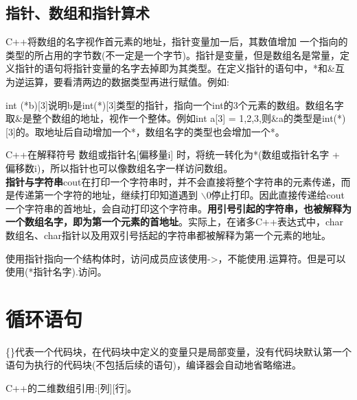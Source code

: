 \documentclass[]{article}
\begin{document}
\subsection{指针、数组和指针算术}
C++将数组的名字视作首元素的地址，指针变量加一后，其数值增加 一个指向的类型的所占用的字节数(不一定是一个字节)。指针是变量，但是数组名是常量，定义指针的语句将指针变量的名字去掉即为其类型。在定义指针的语句中，*和\&互为逆运算，要看清两边的数据类型再进行赋值。例如:\begin{center}
	int (*b)[3]说明b是int(*)[3]类型的指针，指向一个int的3个元素的数组。数组名字取\&是整个数组的地址，视作一个整体。例如int a[3] = {1,2,3},则\&a的类型是int(*)[3]的。取地址后自动增加一个*，数组名字的类型也会增加一个*。
\end{center}C++在解释符号  数组或指针名[偏移量i]   时，将统一转化为*(数组或指针名字 + 偏移数i)，所以指针也可以像数组名字一样访问数组。\\
\textbf{指针与字符串}cout在打印一个字符串时，并不会直接将整个字符串的元素传递，而是传递第一个字符的地址，继续打印知道遇到 $\backslash$0停止打印。因此直接传递给cout一个字符串的首地址，会自动打印这个字符串。\textbf{用引号引起的字符串，也被解释为一个数组名字，即为第一个元素的首地址}。实际上，在诸多C++表达式中，char数组名、char指针以及用双引号括起的字符串都被解释为第一个元素的地址。\\
\par 使用指针指向一个结构体时，访问成员应该使用->，不能使用.运算符。但是可以使用(*指针名字).访问。
\section{循环语句}
\par \{\}代表一个代码块，在代码块中定义的变量只是局部变量，没有代码块默认第一个语句为执行的代码块(不包括后续的语句)，编译器会自动地省略缩进。
\par C++的二维数组引用:[列][行]。
\end{document}
